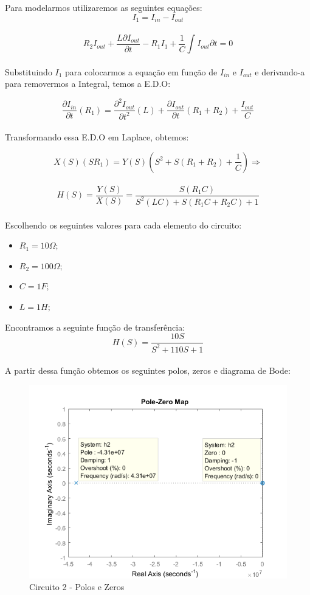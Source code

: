 \documentclass[a4paper, 12pt]{article}
\begin{document}
			Para modelarmos utilizaremos as seguintes equações:
			\[				
				 I_{1} = I_{in} - I_{out}
			\] 	\\	
			\[	
				 R_{2}I_{out} + \frac{L \partial I_{out}}{\partial t} - R_{1}I_{1} + \frac{1}{C}\int I_{out}\partial t = 0
			\] 	\\	
			
			Substituindo $I_{1}$ para colocarmos a equação em função de $I_{in}$ e $I_{out}$ e derivando-a para removermos a Integral, temos a E.D.O:
			
			\[	
				\frac{\partial I_{in}}{\partial t}\left(R_{1}\right) = \frac{\partial^{2}I_{out}}{\partial t^{2}}\left(L\right) + \frac{\partial I_{out}}{\partial t}\left(R_{1} + R_{2}\right) + \frac{I_{out}}{C}
			\] 	\\
						
			Transformando essa E.D.O em Laplace, obtemos:
			
			\[	
				X(S)\left(SR_{1}\right) = Y(S)\left(S^{2} + S\left(R_{1} +  R_{2}\right) + \frac{1}{C}\right) \Rightarrow
			\] 	\\			
			\[
			H(S) = \frac{Y(S)}{X(S)} = \frac{S\left(R_{1}C\right)}{S^{2}\left(LC\right) + S\left(R_{1}C + R_{2}C\right) + 1}
			\] 	\\					
			
			Escolhendo os seguintes valores para cada elemento do circuito:
			\begin{itemize}
				\item $R_{1} = 10\Omega;$
				\item $R_{2} = 100\Omega;$
				\item $C = 1F;$
				\item $L = 1H;$
			\end{itemize}	
							
			Encontramos a seguinte função de transferência:
			\[
				H(S) = \frac{10S}{S^{2} + 110S + 1}
			\] 	\\				
			A partir dessa função obtemos os seguintes polos, zeros e diagrama de Bode:
			\begin{figure}[!ht]
				\centering
				\includegraphics[scale=0.8]{img/1e_circ2.png}
				\caption{Circuito 2 - Polos e Zeros}	
			\end{figure}	
\end{document}

